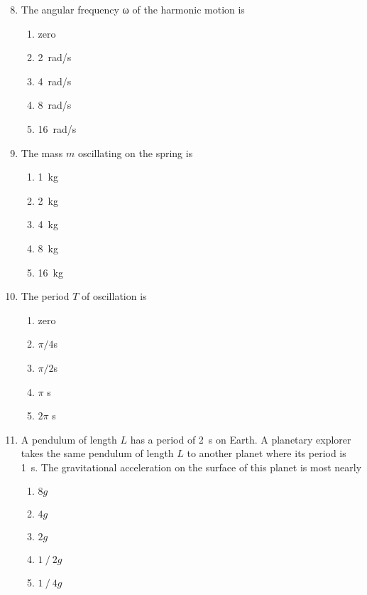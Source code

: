 \documentclass[12pt]{article}
\begin{document}
\begin{enumerate}[leftmargin=50pt,label=\underline{\hspace{0.4in}} \arabic*.]
  \setcounter{enumi}{7}
\item The angular frequency ω of the harmonic motion is
  \begin{enumerate}[noitemsep,topsep=0pt]
  \item zero
  \item\SI{2}{rad/s}
  \item\SI{4}{rad/s}
  \item\SI{8}{rad/s}
  \item\SI{16}{rad/s}
  \end{enumerate}

\item The mass $m$ oscillating on the spring is
  \begin{enumerate}[noitemsep,topsep=0pt]
  \item\SI{1}{\kg}
  \item\SI{2}{\kg}
  \item\SI{4}{\kg}
  \item\SI{8}{\kg}
  \item\SI{16}{\kg}
  \end{enumerate}
  
\item The period $T$ of oscillation is
  \begin{enumerate}[noitemsep,topsep=0pt]
  \item zero
  \item $\pi/4$\si{s}
  \item $\pi/2$\si{s}
  \item $\pi$  \si{s}
  \item $2\pi$ \si{s}
  \end{enumerate}

\item A pendulum of length $L$ has a period of \SI{2}{\s} on Earth. A planetary
  explorer takes the same pendulum of length $L$ to another planet where
  its period is \SI{1}{\s}. The gravitational acceleration on the surface of
  this planet is most nearly
  \begin{enumerate}[noitemsep,topsep=0pt]
  \item $8 g$
  \item $4 g$
  \item $2 g$
  \item $1⁄2 g$
  \item $1⁄4 g$
  \end{enumerate}


\end{enumerate}
\end{document}

